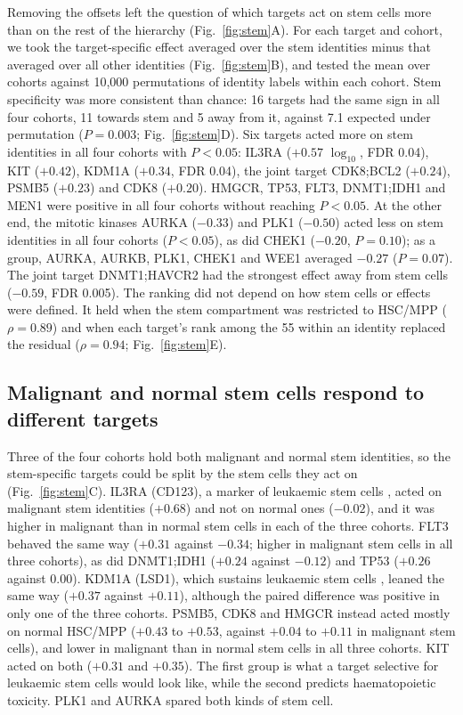\documentclass[pdflatex,sn-vancouver-num]{sn-jnl}%
\begin{document}
Removing the offsets left the question of which targets act on stem cells more than on the rest of the hierarchy (Fig.~\ref{fig:stem}A). For each target and cohort, we took the target-specific effect averaged over the stem identities minus that averaged over all other identities (Fig.~\ref{fig:stem}B), and tested the mean over cohorts against 10,000 permutations of identity labels within each cohort. Stem specificity was more consistent than chance: 16 targets had the same sign in all four cohorts, 11 towards stem and 5 away from it, against 7.1 expected under permutation ($P=0.003$; Fig.~\ref{fig:stem}D). Six targets acted more on stem identities in all four cohorts with $P<0.05$: IL3RA ($+0.57$ $\log_{10}$, FDR 0.04), KIT ($+0.42$), KDM1A ($+0.34$, FDR 0.04), the joint target CDK8;BCL2 ($+0.24$), PSMB5 ($+0.23$) and CDK8 ($+0.20$). HMGCR, TP53, FLT3, DNMT1;IDH1 and MEN1 were positive in all four cohorts without reaching $P<0.05$. At the other end, the mitotic kinases AURKA ($-0.33$) and PLK1 ($-0.50$) acted less on stem identities in all four cohorts ($P<0.05$), as did CHEK1 ($-0.20$, $P=0.10$); as a group, AURKA, AURKB, PLK1, CHEK1 and WEE1 averaged $-0.27$ ($P=0.07$). The joint target DNMT1;HAVCR2 had the strongest effect away from stem cells ($-0.59$, FDR 0.005). The ranking did not depend on how stem cells or effects were defined. It held when the stem compartment was restricted to HSC/MPP ($\rho=0.89$) and when each target's rank among the 55 within an identity replaced the residual ($\rho=0.94$; Fig.~\ref{fig:stem}E).

\subsection{Malignant and normal stem cells respond to different targets}

Three of the four cohorts hold both malignant and normal stem identities, so the stem-specific targets could be split by the stem cells they act on (Fig.~\ref{fig:stem}C). IL3RA (CD123), a marker of leukaemic stem cells \citep{Jordan2000cd123}, acted on malignant stem identities ($+0.68$) and not on normal ones ($-0.02$), and it was higher in malignant than in normal stem cells in each of the three cohorts. FLT3 behaved the same way ($+0.31$ against $-0.34$; higher in malignant stem cells in all three cohorts), as did DNMT1;IDH1 ($+0.24$ against $-0.12$) and TP53 ($+0.26$ against $0.00$). KDM1A (LSD1), which sustains leukaemic stem cells \citep{Harris2012kdm1a}, leaned the same way ($+0.37$ against $+0.11$), although the paired difference was positive in only one of the three cohorts. PSMB5, CDK8 and HMGCR instead acted mostly on normal HSC/MPP ($+0.43$ to $+0.53$, against $+0.04$ to $+0.11$ in malignant stem cells), and lower in malignant than in normal stem cells in all three cohorts. KIT acted on both ($+0.31$ and $+0.35$). The first group is what a target selective for leukaemic stem cells would look like, while the second predicts haematopoietic toxicity. PLK1 and AURKA spared both kinds of stem cell.
\end{document}
